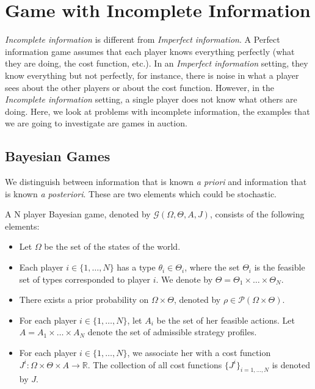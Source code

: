 
\newpage

\section{Game with Incomplete Information}
\emph{Incomplete information} is different from \emph{Imperfect information}. A Perfect information game assumes that each player knows everything perfectly (what they are doing, the cost function, etc.). In an \emph{Imperfect information} setting, they know everything but not perfectly, for instance, there is noise in what a player sees about the other players or about the cost function. However, in the \emph{Incomplete information} setting, a single player does not know what others are doing. Here, we look at problems with incomplete information, the examples that we are going to investigate are games in auction.


\subsection{Bayesian Games}

We distinguish between information that is known \emph{a priori} and information that is known \emph{a posteriori}. These are two elements which could be stochastic. 

\begin{definition}
	A N player Bayesian game, denoted by $\mathcal{G}(\Omega, \Theta, A, J)$, consists of the following elements:
	\begin{itemize}
		\item Let $\Omega$ be the set of the states of the world.
		\item Each player $i \in \{1,\dots,N\}$ has a type $\theta_i \in \Theta_i$, where the set $\Theta_i$ is the feasible set of types corresponded to player $i$. We denote by $\Theta = \Theta_1 \times \dots \times \Theta_N$. 
		\item There exists a prior probability on $\Omega \times \Theta$, denoted by $\rho \in \mathcal{P}(\Omega \times \Theta)$.
		\item  For each player $i \in \{1,\ldots,N\}$, let $A_i$ be the set of her feasible actions. Let $A = A_1 \times \dots \times A_N$ denote the set of admissible strategy profiles.
		\item For each player $i \in \{1,\ldots,N\}$, we associate her with a cost function  $J^i: \Omega \times \Theta \times A \to \mathbb{R}$. The collection of all cost functions $\{J^i\}_{i=1,\ldots,N}$ is denoted by $J$.
	\end{itemize}
	
\end{definition}

